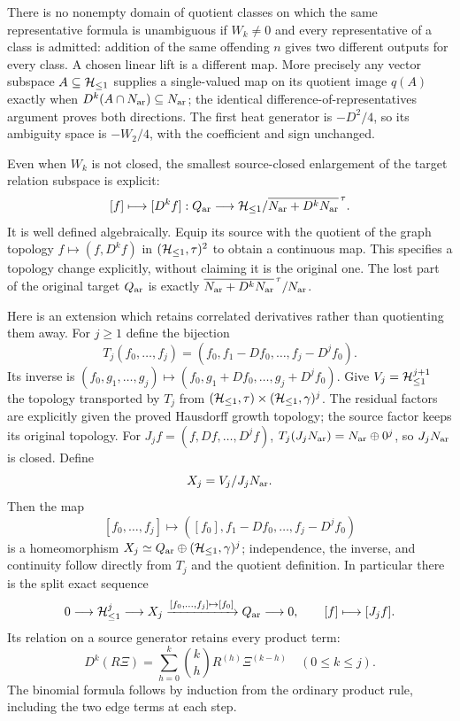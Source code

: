 There is no nonempty domain of quotient classes on which the same
representative formula is unambiguous if $W_k\ne0$ and every
representative of a class is admitted: addition of the same offending
$n$ gives two different outputs for every class. A chosen linear
lift is a different map. More precisely any vector subspace
$A\subseteq\mathcal H_{\leq 1}$ supplies a single-valued map on its quotient image
$q(A)$ exactly when $D^k(A\cap N_{\rm ar})\subseteq N_{\rm ar}$; the identical
difference-of-representatives argument proves both directions.
The first heat generator is $-D^2/4$, so its ambiguity space is
$-W_2/4$, with the coefficient and sign unchanged.

Even when $W_k$ is not closed, the smallest source-closed enlargement
of the target relation subspace is explicit:
\begin{equation}\label{eq:cq-target}
 [f]\longmapsto[D^kf]:
 Q_{\rm ar}\longrightarrow
 \mathcal H_{\leq 1}/\overline{N_{\rm ar}+D^kN_{\rm ar}}^{\,\tau}.
\end{equation}
It is well defined algebraically. Equip its source with the quotient
of the graph topology $f\mapsto(f,D^kf)$ in
$(\mathcal H_{\leq 1},\tau)^2$ to obtain a continuous map. This specifies a
topology change explicitly, without claiming it is the original one.
The lost part of the original target $Q_{\rm ar}$ is exactly
$\overline{N_{\rm ar}+D^kN_{\rm ar}}^{\,\tau}/N_{\rm ar}$.

Here is an extension which retains correlated derivatives rather than
quotienting them away. For $j\geq1$ define the bijection
\[
 T_j(f_0,\ldots,f_j)
   =(f_0,f_1-Df_0,\ldots,f_j-D^jf_0).
\]
Its inverse is $(f_0,g_1,\ldots,g_j)\mapsto
(f_0,g_1+Df_0,\ldots,g_j+D^jf_0)$.
Give $V_j=\mathcal H_{\leq 1}^{j+1}$ the topology transported by $T_j$ from
$(\mathcal H_{\leq 1},\tau)\times(\mathcal H_{\leq 1},\gamma)^j$. The residual factors
are explicitly given the proved Hausdorff growth topology; the
source factor keeps its original topology. For $J_jf=(f,Df,\ldots,D^jf)$,
$T_j(J_jN_{\rm ar})=N_{\rm ar}\oplus0^j$, so $J_jN_{\rm ar}$ is closed.
Define
\begin{equation}\label{eq:cq-jetextension}
 X_j=V_j/J_jN_{\rm ar}.
\end{equation}
Then the map
\[
 [f_0,\ldots,f_j]\longmapsto
 ([f_0],f_1-Df_0,\ldots,f_j-D^jf_0)
\]
is a homeomorphism $X_j\simeq Q_{\rm ar}\oplus(\mathcal H_{\leq 1},\gamma)^j$; independence,
the inverse, and continuity follow directly from $T_j$ and the
quotient definition. In particular there is the split exact sequence
\begin{equation}\label{eq:cq-jetseq}
 0\longrightarrow\mathcal H_{\leq 1}^j\longrightarrow X_j
 \xrightarrow{[f_0,\ldots,f_j]\mapsto[f_0]}Q_{\rm ar}
 \longrightarrow0,
 \qquad [f]\longmapsto[J_jf].
\end{equation}
Its relation on a source generator retains every product term:
\begin{equation}\label{eq:cq-rawjet}
 D^k(R\Xi)=\sum_{h=0}^k\binom kh R^{(h)}\Xi^{(k-h)}
                    \quad(0\leq k\leq j).
\end{equation}
The binomial formula follows by induction from the ordinary product
rule, including the two edge terms at each step.

